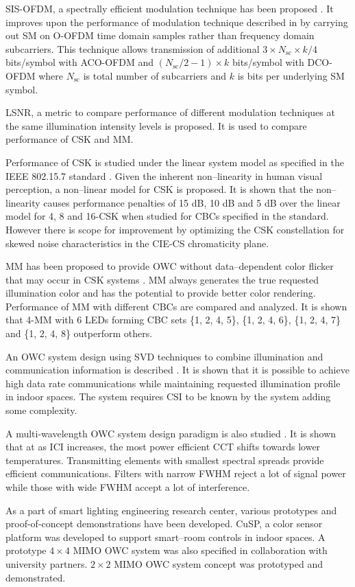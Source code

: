 SIS-OFDM, a spectrally efficient modulation technique has been proposed \cite{but14b}. It improves upon the performance of modulation technique described in \cite{zha12a} by carrying out SM on O-OFDM time domain samples rather than frequency domain subcarriers. This technique allows transmission of additional $3\times N_{\text{sc}}\times k/4$ bits/symbol with ACO-OFDM and $(N_{\text{sc}}/2 - 1)\times k$ bits/symbol with DCO-OFDM where $N_{\text{sc}}$ is total number of subcarriers and $k$ is bits per underlying SM symbol.

LSNR, a metric to compare performance of different modulation techniques at the same illumination intensity levels is proposed. It is used to compare performance of CSK and MM.

Performance of CSK is studied under the linear system model as specified in the IEEE 802.15.7 standard \cite{IEEE802.15.7}. Given the inherent non--linearity in human visual perception, a non--linear model for CSK is proposed. It is shown that the non--linearity causes performance penalties of 15 dB, 10 dB and 5 dB over the linear model for 4, 8 and 16-CSK when studied for CBCs specified in the standard. However there is scope for improvement by optimizing the CSK constellation for skewed noise characteristics in the CIE-CS chromaticity plane.

MM has been proposed to provide OWC without data--dependent color flicker that may occur in CSK systems \cite{but12a}. MM always generates the true requested illumination color and has the potential to provide better color rendering. Performance of MM with different CBCs are compared and analyzed. It is shown that 4-MM with 6 LEDs forming CBC sets \{1, 2, 4, 5\}, \{1, 2, 4, 6\}, \{1, 2, 4, 7\} and \{1, 2, 4, 8\} outperform others.

An OWC system design using SVD techniques to combine illumination and communication information is described \cite{but13a}. It is shown that it is possible to achieve high data rate communications while maintaining requested illumination profile in indoor spaces. The system requires CSI to be known by the system adding some complexity.

A multi-wavelength OWC system design paradigm is also studied \cite{but14c}. It is shown that at as ICI increases, the most power efficient CCT shifts towards lower temperatures. Transmitting elements with smallest spectral spreads provide efficient communications. Filters with narrow FWHM reject a lot of signal power while those with wide FWHM accept a lot of interference.

As a part of smart lighting engineering research center, various prototypes and proof-of-concept demonstrations have been developed. CuSP, a color sensor platform was developed to support smart--room controls in indoor spaces. A prototype $4\times 4$ MIMO OWC system was also specified in collaboration with university partners. $2\times 2$ MIMO OWC system concept was prototyped and demonstrated.